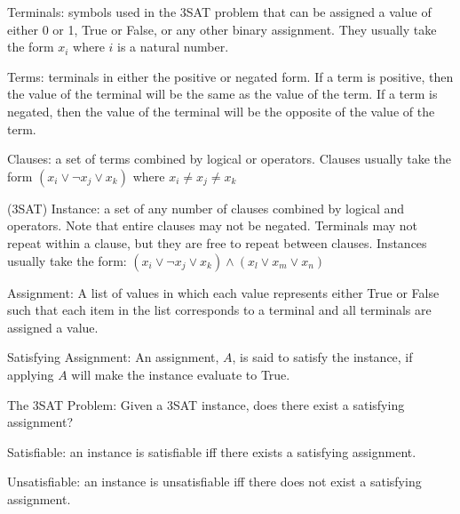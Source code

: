 \documentclass[manuscript]{acmart}
\begin{document}
    \begin{definition}
        Terminals: symbols used in the 3SAT problem that can be assigned a value
        of either 0 or 1, True or False, or any other binary assignment. They usually
        take the form $x_i$ where $i$ is a natural number.
    \end{definition}
    \begin{definition}
        Terms: terminals in either the positive or negated form. If a term is positive, 
        then the value of the terminal will be the same as the value of the term. If a
        term is negated, then the value of the terminal will be the opposite of the 
        value of the term.
    \end{definition}
    \begin{definition}
        Clauses: a set of terms combined by logical or operators.
        Clauses usually take the form 
        $(x_i \lor \neg x_j \lor x_k)$ where $x_i \neq x_j \neq x_k$
    \end{definition}
    \begin{definition}
        (3SAT) Instance: a set of any number of clauses combined by logical
        and operators. Note that entire clauses may not be negated. Terminals may
        not repeat within a clause, but they are free to repeat between clauses. 
        Instances usually take the form:
        $(x_i \lor \neg x_j \lor x_k) \land (x_l \lor x_m \lor x_n)$
    \end{definition}
    \begin{definition}
        Assignment: A list of values in which each value represents either True
        or False such that each item in the list corresponds to a terminal and 
        all terminals are assigned a value.
    \end{definition}
    \begin{definition}
        Satisfying Assignment: An assignment, $A$, is said to satisfy the instance, 
        if applying $A$ will make the instance evaluate to True.
    \end{definition}
    \begin{definition}
        The 3SAT Problem: Given a 3SAT instance, does there exist a satisfying assignment?
    \end{definition}
    \begin{definition}
        Satisfiable: an instance is satisfiable iff there exists a satisfying assignment.
    \end{definition}
    \begin{definition}
        Unsatisfiable: an instance is unsatisfiable iff there does not exist a satisfying assignment.
    \end{definition}
\end{document}
